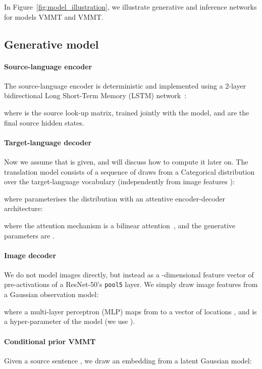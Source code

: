 \documentclass[11pt,a4paper]{article}
\newcommand{\cond}{VMMT\xspace}
\newcommand{\uncond}{VMMT\xspace}
\begin{document}
In Figure~\ref{fig:model_illustration}, we illustrate generative and inference networks for models \cond and \uncond.





\subsection{Generative model}
\paragraph{Source-language encoder}
The source-language encoder is deterministic and implemented using a 2-layer bidirectional Long Short-Term Memory (LSTM) network~\citep{HochreiterSchmidhuber1997_LSTM}:

where  is the source look-up matrix, trained jointly with the model, and  are the final source hidden states.

\paragraph{Target-language decoder}
Now we assume that  is given, and will discuss how to compute it later on. The translation model consists of a sequence of draws from a Categorical distribution over the target-language vocabulary (independently from image features ):

where  parameterises the distribution with an attentive encoder-decoder architecture:

where the attention mechanism is a bilinear attention~\citep{Luongetal2015}, and the generative parameters are .

\paragraph{Image decoder}
We do not model images directly, but instead as a -dimensional feature vector  of pre-activations of a ResNet-50's \texttt{pool5} layer.
We simply draw image features from a Gaussian observation model:

where a multi-layer perceptron (MLP) maps from  to a vector of locations , and  is a hyper-parameter of the model (we use ). 


\paragraph{Conditional prior \cond}
Given a source sentence , we draw an embedding  from a latent Gaussian model:
\end{document}
